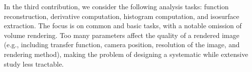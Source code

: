 In the third contribution, we consider the following analysis tasks: function reconstruction,
derivative computation, histogram computation, and isosurface extraction. The focus is on common and
basic tasks, with a notable omission of volume rendering. Too many parameters affect the quality of
a rendered image (e.g., including transfer function, camera position, resolution of the image, and
rendering method), making the problem of designing a systematic while extensive study less tractable.


